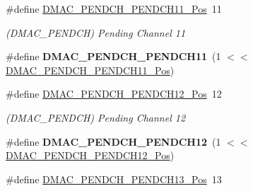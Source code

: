 \begin{DoxyCompactItemize}
\item 
\hypertarget{group___s_a_m_l21___d_m_a_c_gabd8e958ed451c4deac350423d663342a}{}\#define \hyperlink{group___s_a_m_l21___d_m_a_c_gabd8e958ed451c4deac350423d663342a}{D\+M\+A\+C\+\_\+\+P\+E\+N\+D\+C\+H\+\_\+\+P\+E\+N\+D\+C\+H11\+\_\+\+Pos}~11\label{group___s_a_m_l21___d_m_a_c_gabd8e958ed451c4deac350423d663342a}

\begin{DoxyCompactList}\small\item\em (D\+M\+A\+C\+\_\+\+P\+E\+N\+D\+C\+H) Pending Channel 11 \end{DoxyCompactList}\item 
\hypertarget{group___s_a_m_l21___d_m_a_c_ga1db91d30b44533889b97a57f055c17ea}{}\#define {\bfseries D\+M\+A\+C\+\_\+\+P\+E\+N\+D\+C\+H\+\_\+\+P\+E\+N\+D\+C\+H11}~(1 $<$$<$ \hyperlink{group___s_a_m_l21___d_m_a_c_gabd8e958ed451c4deac350423d663342a}{D\+M\+A\+C\+\_\+\+P\+E\+N\+D\+C\+H\+\_\+\+P\+E\+N\+D\+C\+H11\+\_\+\+Pos})\label{group___s_a_m_l21___d_m_a_c_ga1db91d30b44533889b97a57f055c17ea}

\item 
\hypertarget{group___s_a_m_l21___d_m_a_c_ga1c678cd191b14b14a63c358a60f25a2a}{}\#define \hyperlink{group___s_a_m_l21___d_m_a_c_ga1c678cd191b14b14a63c358a60f25a2a}{D\+M\+A\+C\+\_\+\+P\+E\+N\+D\+C\+H\+\_\+\+P\+E\+N\+D\+C\+H12\+\_\+\+Pos}~12\label{group___s_a_m_l21___d_m_a_c_ga1c678cd191b14b14a63c358a60f25a2a}

\begin{DoxyCompactList}\small\item\em (D\+M\+A\+C\+\_\+\+P\+E\+N\+D\+C\+H) Pending Channel 12 \end{DoxyCompactList}\item 
\hypertarget{group___s_a_m_l21___d_m_a_c_ga5ef4a5fc3e6300b2fc51a3a3512c4cfc}{}\#define {\bfseries D\+M\+A\+C\+\_\+\+P\+E\+N\+D\+C\+H\+\_\+\+P\+E\+N\+D\+C\+H12}~(1 $<$$<$ \hyperlink{group___s_a_m_l21___d_m_a_c_ga1c678cd191b14b14a63c358a60f25a2a}{D\+M\+A\+C\+\_\+\+P\+E\+N\+D\+C\+H\+\_\+\+P\+E\+N\+D\+C\+H12\+\_\+\+Pos})\label{group___s_a_m_l21___d_m_a_c_ga5ef4a5fc3e6300b2fc51a3a3512c4cfc}

\item 
\hypertarget{group___s_a_m_l21___d_m_a_c_ga82977a6d782b963595005bbf6f47ef3f}{}\#define \hyperlink{group___s_a_m_l21___d_m_a_c_ga82977a6d782b963595005bbf6f47ef3f}{D\+M\+A\+C\+\_\+\+P\+E\+N\+D\+C\+H\+\_\+\+P\+E\+N\+D\+C\+H13\+\_\+\+Pos}~13\label{group___s_a_m_l21___d_m_a_c_ga82977a6d782b963595005bbf6f47ef3f}


\end{DoxyCompactItemize}
